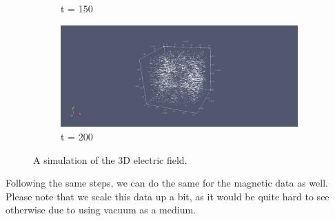 \begin{figure}[h!]
\begin{subfigure}{.49\textwidth}
		\caption{t = 150}
	\end{subfigure}
	\begin{subfigure}{.49\textwidth}
		\centering
		\includegraphics[width=.95\linewidth]{Figures/FDTD3DE4}
		\caption{t = 200}
	\end{subfigure}
	\decoRule
	\caption[3D Electric Field Simulation]{A simulation of the 3D electric field.}
	\label{fig:FDTD3DE}
\end{figure}

Following the same steps, we can do the same for the magnetic data as well. Please note that we scale this data up a bit, as it would be quite hard to see otherwise due to using vacuum as a medium.


